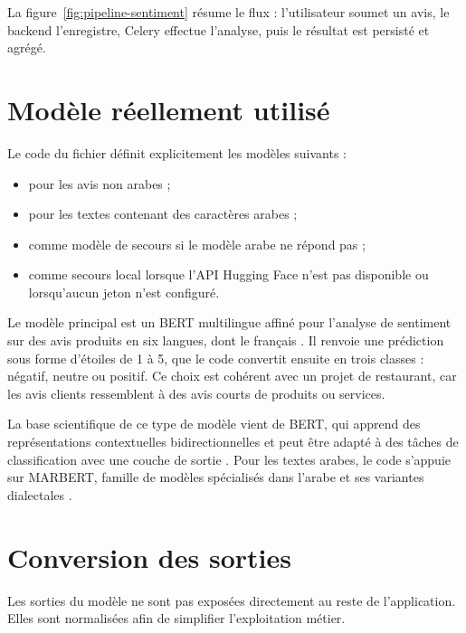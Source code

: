 La figure~\ref{fig:pipeline-sentiment} résume le flux : l'utilisateur soumet un avis, le backend l'enregistre, Celery effectue l'analyse, puis le résultat est persisté et agrégé.

\section{Modèle réellement utilisé}
Le code du fichier  définit explicitement les modèles suivants :

\begin{itemize}
  \item {} pour les avis non arabes ;
  \item {} pour les textes contenant des caractères arabes ;
  \item {} comme modèle de secours si le modèle arabe ne répond pas ;
  \item {} comme secours local lorsque l'API Hugging Face n'est pas disponible ou lorsqu'aucun jeton n'est configuré.
\end{itemize}

Le modèle principal  est un BERT multilingue affiné pour l'analyse de sentiment sur des avis produits en six langues, dont le français \cite{nlptown}. Il renvoie une prédiction sous forme d'étoiles de 1 à 5, que le code convertit ensuite en trois classes : négatif, neutre ou positif. Ce choix est cohérent avec un projet de restaurant, car les avis clients ressemblent à des avis courts de produits ou services.

La base scientifique de ce type de modèle vient de BERT, qui apprend des représentations contextuelles bidirectionnelles et peut être adapté à des tâches de classification avec une couche de sortie \cite{bert}. Pour les textes arabes, le code s'appuie sur MARBERT, famille de modèles spécialisés dans l'arabe et ses variantes dialectales \cite{marbert}.

\section{Conversion des sorties}
Les sorties du modèle ne sont pas exposées directement au reste de l'application. Elles sont normalisées afin de simplifier l'exploitation métier.

